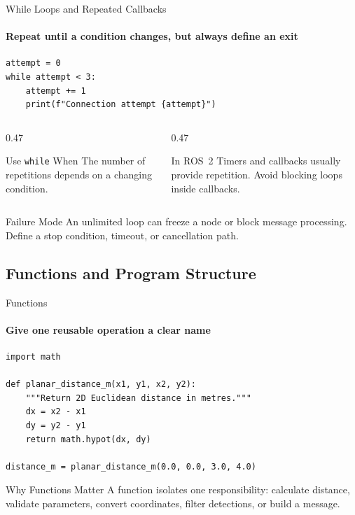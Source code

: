 \begin{frame}[fragile]{While Loops and Repeated Callbacks}
\framesubtitle{Repeat until a condition changes, but always define an exit}

\begin{verbatim}
attempt = 0
while attempt < 3:
    attempt += 1
    print(f"Connection attempt {attempt}")
\end{verbatim}

\begin{columns}[T,onlytextwidth]
\begin{column}{0.47\textwidth}
\begin{block}{Use \texttt{while} When}
The number of repetitions depends on a changing condition.
\end{block}
\end{column}
\hfill
\begin{column}{0.47\textwidth}
\begin{block}{In ROS~2}
Timers and callbacks usually provide repetition. Avoid blocking loops inside callbacks.
\end{block}
\end{column}
\end{columns}
\begin{alertblock}{Failure Mode}
An unlimited loop can freeze a node or block message processing. Define a stop condition, timeout, or cancellation path.
\end{alertblock}
\end{frame}

\subsection{Functions and Program Structure}

\begin{frame}[fragile]{Functions}
\framesubtitle{Give one reusable operation a clear name}
\begin{verbatim}
import math

def planar_distance_m(x1, y1, x2, y2):
    """Return 2D Euclidean distance in metres."""
    dx = x2 - x1
    dy = y2 - y1
    return math.hypot(dx, dy)

distance_m = planar_distance_m(0.0, 0.0, 3.0, 4.0)
\end{verbatim}
\begin{exampleblock}{Why Functions Matter}
A function isolates one responsibility: calculate distance, validate parameters, convert coordinates, filter detections, or build a message.
\end{exampleblock}
\end{frame}

